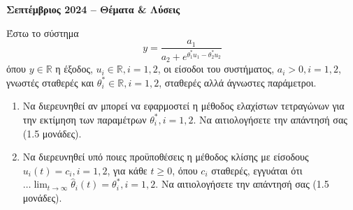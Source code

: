 \documentclass[a4paper,11pt]{article}
\begin{document}
\begin{center}
\textbf{\Large Σεπτέμβριος 2024 -- Θέματα \& Λύσεις}
\end{center}

\begin{question}
Έστω το σύστημα
\begin{equation}
    y = \frac{a_1}{a_2 + e^{\theta_1^* u_1 - \theta_2^* u_2}}
\end{equation}
όπου $y \in \mathbb{R}$ η έξοδος, $u_i \in \mathbb{R}, i = 1, 2$, οι είσοδοι του συστήματος, $a_i > 0, i = 1, 2$, γνωστές σταθερές και $\theta_i^* \in \mathbb{R}, i = 1, 2$, σταθερές αλλά άγνωστες παράμετροι.
\begin{enumerate}
    \item[α)] Να διερευνηθεί αν μπορεί να εφαρμοστεί η μέθοδος ελαχίστων τετραγώνων για την εκτίμηση των παραμέτρων $\theta_i^*, i = 1, 2$. Να αιτιολογήσετε την απάντησή σας (1.5 μονάδες).
    \item[β)] Να διερευνηθεί υπό ποιες προϋποθέσεις η μέθοδος κλίσης με είσοδους $u_i(t) = c_i, i = 1, 2$, για κάθε $t \ge 0$, όπου $c_i$ σταθερές, εγγυάται ότι $\dots \lim_{t \to \infty} \hat{\theta}_i(t) = \theta_i^*, i = 1, 2$. Να αιτιολογήσετε την απάντησή σας (1.5 μονάδες).
\end{enumerate}
\end{question}
\end{document}
